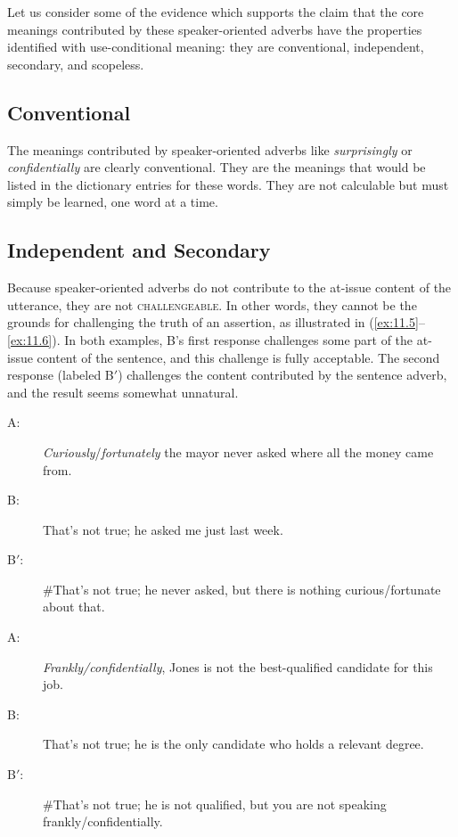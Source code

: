 Let us consider some of the evidence which supports the claim that the core meanings contributed by these speaker-oriented adverbs have the properties identified with use-conditional meaning: they are conventional, independent, secondary, and scopeless.



\subsection*{Conventional}

The meanings contributed by speaker-oriented adverbs like \textit{surprisingly} or \textit{confidentially} are clearly conventional. They are the meanings that would be listed in the dictionary entries for these words. They are not calculable but must simply be learned, one word at a time.


\subsection*{Independent and Secondary}

Because speaker-oriented adverbs do not contribute to the at-issue content of the utterance, they are not \textsc{challengeable}. In other words, they cannot be the grounds for challenging the truth of an assertion, as illustrated in (\ref{ex:11.5}–\ref{ex:11.6}). In both examples, B’s first response challenges some part of the at-issue content of the sentence, and this challenge is fully acceptable. The second response (labeled B$'$) challenges the content contributed by the sentence adverb, and the result seems somewhat unnatural.



\ea \label{ex:11.5}
\begin{description}
\item[A:] \textit{Curiously}/\textit{fortunately} the mayor never asked where all the money came from.
\item[B:] That’s not true; he asked me just last week.
\item[B$'$:] \#That’s not true; he never asked, but there is nothing curious/fortunate about that.
\end{description}
\ex \label{ex:11.6}
\begin{description}
\item[A:] \textit{Frankly/confidentially}, Jones is not the best-qualified candidate for this job.
\item[B:] That’s not true; he is the only candidate who holds a relevant degree.
\item[B$'$:] \#That’s not true; he is not qualified, but you are not speaking frankly/confidentially.
\end{description}
\z


